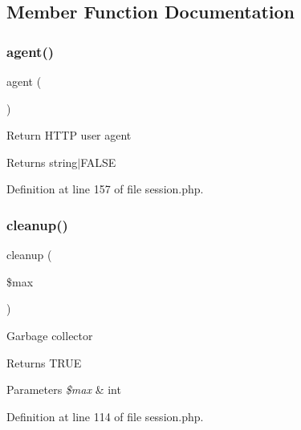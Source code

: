 \subsection{Member Function Documentation}
\hypertarget{class_d_b_1_1_jig_1_1_session_a77f6a261d70e66c7b7273774832482dc}{}\label{class_d_b_1_1_jig_1_1_session_a77f6a261d70e66c7b7273774832482dc} 
\subsubsection{\texorpdfstring{agent()}{agent()}}
{\footnotesize\ttfamily agent (\begin{DoxyParamCaption}{ }\end{DoxyParamCaption})}

Return H\+T\+TP user agent \begin{DoxyReturn}{Returns}
string$\vert$\+F\+A\+L\+SE 
\end{DoxyReturn}


Definition at line 157 of file session.\+php.

\hypertarget{class_d_b_1_1_jig_1_1_session_a60b027eb0df6d42b8fe2ec8c93cfbbae}{}\label{class_d_b_1_1_jig_1_1_session_a60b027eb0df6d42b8fe2ec8c93cfbbae} 
\subsubsection{\texorpdfstring{cleanup()}{cleanup()}}
{\footnotesize\ttfamily cleanup (\begin{DoxyParamCaption}\item[{}]{\$max }\end{DoxyParamCaption})}

Garbage collector \begin{DoxyReturn}{Returns}
T\+R\+UE 
\end{DoxyReturn}

\begin{DoxyParams}{Parameters}
{\em \$max} & int \\
\hline
\end{DoxyParams}


Definition at line 114 of file session.\+php.

\hypertarget{class_d_b_1_1_jig_1_1_session_aa69c8bf1f1dcf4e72552efff1fe3e87e}{}\label{class_d_b_1_1_jig_1_1_session_aa69c8bf1f1dcf4e72552efff1fe3e87e} 
